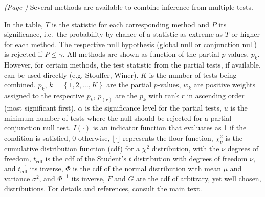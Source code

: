 \begin{table}[b!]
\caption{\emph{(Page \pageref{tab:comparisonT})} Several methods are available to combine inference from multiple tests.}
{\footnotesize In the table, $T$ is the statistic for each corresponding method and $P$ its significance, i.e.\ the probability by chance of a statistic as extreme as $T$ or higher for each method.
The respective null hypothesis (global null or conjunction null) is rejected if $P \leqslant \gamma$.
All methods are shown as function of the partial $p$-values, $p_{k}$. However, for certain methods, the test statistic from the partial tests, if available, can be used directly (e.g. Stouffer, Winer).
$K$ is the number of tests being combined,
$p_{k}$, $k=\left\{1,2,\ldots,K\right\}$ are the partial $p$-values,
$w_{k}$ are positive weights assigned to the respective $p_{k}$,
$p_{(r)}$ are the $p_{k}$ with rank $r$ in ascending order (most significant first),
$\alpha$ is the significance level for the partial tests,
$u$ is the minimum number of tests where the null should be rejected for a partial conjunction null test,
$I(\cdot)$ is an indicator function that evaluates as 1 if the condition is satisfied, 0 otherwise,
$\lfloor \cdot \rfloor$ represents the floor function,
$\chi^{2}_{\nu}$ is the cumulative distribution function (cdf) for a $\chi^{2}$ distribution, with the $\nu$ degrees of freedom,
$t_{\text{cdf}}$ is the cdf of the Student's $t$ distribution with degrees of freedom $\nu$, and $t_{\text{cdf}}^{-1}$ its inverse,
$\Phi$ is the cdf of the normal distribution with mean $\mu$ and variance $\sigma^{2}$, and $\Phi^{-1}$ its inverse,
$F$ and $G$ are the cdf of arbitrary, yet well chosen, distributions.
For details and references, consult the main text.}
\label{tab:comparisonC}
\end{table}

